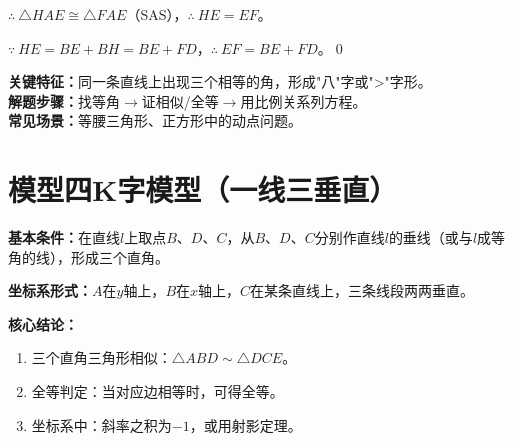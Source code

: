 \documentclass[12pt, a4paper]{ctexart}
\begin{document}
$\therefore\ \triangle HAE \cong \triangle FAE$（SAS），$\therefore\ HE = EF$。

$\because\ HE = BE + BH = BE + FD$，$\therefore\ EF = BE + FD$。\qed

\begin{tipbox}
\textbf{关键特征：}同一条直线上出现三个相等的角，形成"八"字或"\textgreater"字形。\\
\textbf{解题步骤：}找等角$\longrightarrow$证相似/全等$\longrightarrow$用比例关系列方程。\\
\textbf{常见场景：}等腰三角形、正方形中的动点问题。
\end{tipbox}

\newpage
\section*{\textcolor{modelteal}{模型四\quad K字模型（一线三垂直）}}

\begin{modelbox}
\textbf{基本条件：}在直线$l$上取点$B$、$D$、$C$，从$B$、$D$、$C$分别作直线$l$的垂线（或与$l$成等角的线），形成三个直角。

\textbf{坐标系形式：}$A$在$y$轴上，$B$在$x$轴上，$C$在某条直线上，三条线段两两垂直。

\textbf{核心结论：}
\begin{enumerate}[label=(\arabic*)]
  \item 三个直角三角形相似：$\triangle ABD \sim \triangle DCE$。
  \item 全等判定：当对应边相等时，可得全等。
  \item 坐标系中：斜率之积为$-1$，或用射影定理。
\end{enumerate}
\end{modelbox}
\end{document}
